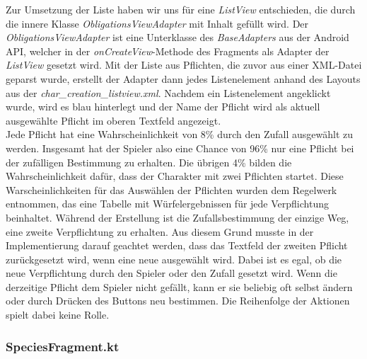 Zur Umsetzung der Liste haben wir uns für eine \textit{ListView} entschieden, die durch die innere Klasse \textit{ObligationsViewAdapter} mit Inhalt gefüllt wird. Der \textit{ObligationsViewAdapter} ist eine Unterklasse des \textit{BaseAdapters} aus der Android API, welcher in der \textit{onCreateView}-Methode des Fragments als Adapter der \textit{ListView} gesetzt wird. Mit der Liste aus Pflichten, die zuvor aus einer XML-Datei geparst wurde, erstellt der Adapter dann jedes Listenelement anhand des Layouts aus der \textit{char\_creation\_listview.xml}. Nachdem ein Listenelement angeklickt wurde, wird es blau hinterlegt und der Name der Pflicht wird als aktuell ausgewählte Pflicht im oberen Textfeld angezeigt.\\

Jede Pflicht hat eine Wahrscheinlichkeit von 8\% durch den Zufall ausgewählt zu werden. Insgesamt hat der Spieler also eine Chance von 96\% nur eine Pflicht bei der zufälligen Bestimmung zu erhalten. Die übrigen 4\% bilden die Wahrscheinlichkeit dafür, dass der Charakter mit zwei Pflichten startet. Diese Warscheinlichkeiten für das Auswählen der Pflichten wurden dem Regelwerk \cite[39]{rulebook} entnommen, das eine Tabelle mit Würfelergebnissen für jede Verpflichtung beinhaltet. Während der Erstellung ist die Zufallsbestimmung der einzige Weg, eine zweite Verpflichtung zu erhalten. Aus diesem Grund musste in der Implementierung darauf geachtet werden, dass das Textfeld der zweiten Pflicht zurückgesetzt wird, wenn eine neue ausgewählt wird. Dabei ist es egal, ob die neue Verpflichtung durch den Spieler oder den Zufall gesetzt wird. Wenn die derzeitige Pflicht dem Spieler nicht gefällt, kann er sie beliebig oft selbst ändern oder durch Drücken des Buttons neu bestimmen. Die Reihenfolge der Aktionen spielt dabei keine Rolle.\\

\subsubsection{SpeciesFragment.kt}

